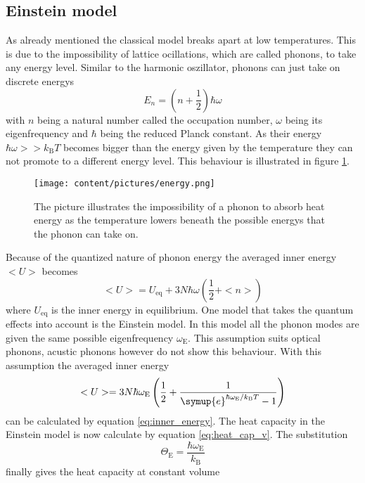 \subsection{Einstein model}
As already mentioned the classical model breaks apart at low temperatures.
This is due to the impossibility of lattice ocillations, which are called phonons, to take any energy level.
Similar to the harmonic oszillator, phonons can just take on discrete energys
\begin{equation*}
    E_n = (n +\frac{1}{2})\hbar\omega
\end{equation*}
with $n$ being a natural number called the occupation number, $\omega$ being its eigenfrequency and $\hbar$ being the reduced Planck constant.
As their energy $\hbar\omega>>k_\text{B}T$ becomes bigger than the energy given by the temperature they can not promote to a different energy level.
This behaviour is illustrated in figure \ref{fig:energy_phonon}.
\begin{figure}
    \centering
    \texttt{[image: content/pictures/energy.png]}
    \caption{The picture illustrates the impossibility of a phonon to absorb heat energy as the temperature lowers beneath the possible energys that the phonon can take on.}
    \label{fig:energy_phonon}
\end{figure}
Because of the quantized nature of phonon energy the averaged inner energy $<U>$ becomes
\begin{equation}
    <U> = U_\text{eq} + 3N\hbar\omega(\frac{1}{2} + <n>)
    \label{eq:inner_energy}
\end{equation}
where $U_\text{eq}$ is the inner energy in equilibrium.
One model that takes the quantum effects into account is the Einstein model.
In this model all the phonon modes are given the same possible eigenfrequency $\omega_\text{E}$.
This assumption suits optical phonons, acustic phonons however do not show this behaviour. 
With this assumption the averaged inner energy 
\begin{equation*}
    <U> = 3N\hbar\omega_\text{E} \left ( \frac{1}{2} + \frac{1}{\symup{e}^{\hbar\omega_\text{E}/k_\text{B}T} - 1}\right )
\end{equation*}
can be calculated by equation \eqref{eq:inner_energy}.
The heat capacity in the Einstein model is now calculate by equation \eqref{eq:heat_cap_v}.
The substitution 
\begin{equation*}
    \Theta_\text{E} = \frac{\hbar\omega_\text{E}}{k_\text{B}}
\end{equation*}
finally gives the heat capacity at constant volume
